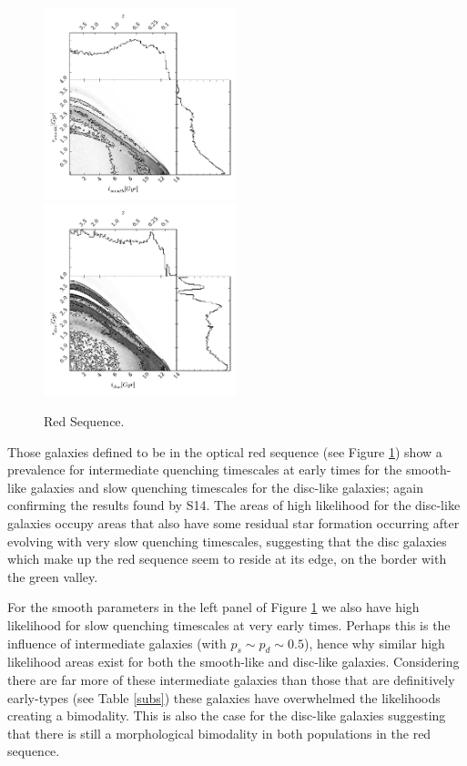 \documentclass[useAMS,usenatbib]{mn2e}
\begin{document}
\begin{figure}
\includegraphics[width=0.4975\textwidth]{red_smooth.pdf}
\includegraphics[width=0.4975\textwidth]{red_disc.pdf}
\caption[8pt]{Red Sequence.}
\label{red_s}
\end{figure}

Those galaxies defined to be in the optical red sequence (see Figure \ref{red_s}) show a prevalence for intermediate quenching timescales at early times for the smooth-like galaxies and slow quenching timescales for the disc-like galaxies; again confirming the results found by S14. The areas of high likelihood for the disc-like galaxies occupy areas that also have some residual star formation occurring after evolving with very slow quenching timescales, suggesting that the disc galaxies which make up the red sequence seem to reside at its edge, on the border with the green valley. 

For the smooth parameters in the left panel of Figure \ref{red_s} we also have high likelihood for slow quenching timescales at very early times. Perhaps this is the influence of intermediate galaxies (with $p_s \sim p_d \sim 0.5$), hence why similar high likelihood areas exist for both the smooth-like and disc-like galaxies. Considering there are far more of these intermediate galaxies than those that are definitively early-types (see Table \ref{subs}) these galaxies have overwhelmed the likelihoods creating a bimodality. This is also the case for the disc-like galaxies suggesting that there is still a morphological bimodality in both populations in the red sequence.
\end{document}
